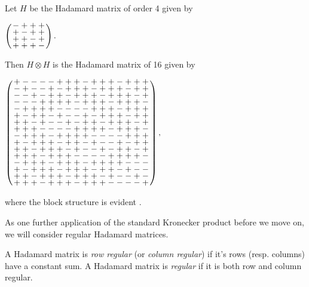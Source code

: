 \documentclass[../../../main]{subfiles}
\begin{document}
 \begin{ex}\label{regular-ex}
  Let $H$ be the Hadamard matrix of order 4 given by
  \begin{defenum}
   \item $
   \arraycolsep=1.25pt\def\arraystretch{0.625}
   \left(\begin{array}{cccc}
    -&+&+&+\\
    +&-&+&+\\
    +&+&-&+\\
    +&+&+&-
   \end{array}\right).
   $
  \end{defenum}
  Then $H \otimes H$ is the Hadamard matrix of 16 given by
  \begin{defenum}[resume]
   \item $
   \arraycolsep=1.25pt\def\arraystretch{0.625}
   \left(\begin{array}{cccccccccccccccc}
+&-&-&-&-&+&+&+&-&+&+&+&-&+&+&+\\
-&+&-&-&+&-&+&+&+&-&+&+&+&-&+&+\\
-&-&+&-&+&+&-&+&+&+&-&+&+&+&-&+\\
-&-&-&+&+&+&+&-&+&+&+&-&+&+&+&-\\
-&+&+&+&+&-&-&-&-&+&+&+&-&+&+&+\\
+&-&+&+&-&+&-&-&+&-&+&+&+&-&+&+\\
+&+&-&+&-&-&+&-&+&+&-&+&+&+&-&+\\
+&+&+&-&-&-&-&+&+&+&+&-&+&+&+&-\\
-&+&+&+&-&+&+&+&+&-&-&-&-&+&+&+\\
+&-&+&+&+&-&+&+&-&+&-&-&+&-&+&+\\
+&+&-&+&+&+&-&+&-&-&+&-&+&+&-&+\\
+&+&+&-&+&+&+&-&-&-&-&+&+&+&+&-\\
-&+&+&+&-&+&+&+&-&+&+&+&+&-&-&-\\
+&-&+&+&+&-&+&+&+&-&+&+&-&+&-&-\\
+&+&-&+&+&+&-&+&+&+&-&+&-&-&+&-\\
+&+&+&-&+&+&+&-&+&+&+&-&-&-&-&+
   \end{array}\right),
   $
  \end{defenum}
  where the block structure is evident .
 \end{ex}
 
 As one further application of the standard Kronecker product before we move on, we will consider regular Hadamard matrices.
 
 \begin{defin}
  A Hadamard matrix is {\it row regular} (or {\it column regular}) if it's rows (resp. columns) have a constant sum. A Hadamard matrix is {\it regular} if it is both row and column regular.
 \end{defin}
 
\end{document}
